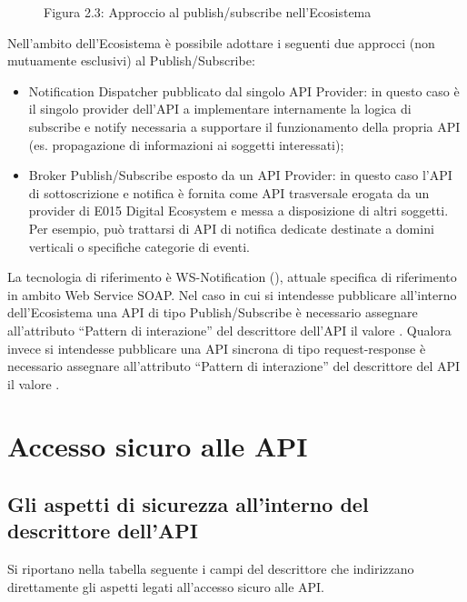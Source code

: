 \documentclass[letterpaper,10pt,italian]{sphinxmanual}
\begin{document}
\begin{figure}[htbp]
\centering
\capstart

\noindent{}
\caption{Figura 2.3: Approccio al publish/subscribe nell’Ecosistema}\label{\detokenize{sez21:id3}}\end{figure}

Nell’ambito dell’Ecosistema è possibile adottare i seguenti due approcci (non mutuamente esclusivi) al Publish/Subscribe:
\begin{itemize}
\item {} 
Notification Dispatcher pubblicato dal singolo API Provider: in questo caso è il singolo provider dell’API a implementare internamente la logica di subscribe e notify necessaria a supportare il funzionamento della propria API (es. propagazione di informazioni ai soggetti interessati);

\item {} 
Broker Publish/Subscribe esposto da un API Provider: in questo caso l’API di sottoscrizione e notifica è fornita come API trasversale erogata da un provider di E015 Digital Ecosystem e messa a disposizione di altri soggetti. Per esempio, può trattarsi di API di notifica dedicate destinate a domini verticali o specifiche categorie di eventi.

\end{itemize}

La tecnologia di riferimento è WS-Notification (), attuale specifica di riferimento in ambito Web Service SOAP.
Nel caso in cui si intendesse pubblicare all’interno dell’Ecosistema una API di tipo Publish/Subscribe è necessario assegnare all’attributo “Pattern di interazione” del descrittore dell’API il valore .
Qualora invece si intendesse pubblicare una API sincrona di tipo request-response è necessario assegnare all’attributo “Pattern di interazione” del descrittore del API il valore .


\section{Accesso sicuro alle API}
\label{\detokenize{sez22:sezione22}}\label{\detokenize{sez22:accesso-sicuro-alle-api}}\label{\detokenize{sez22::doc}}



\subsection{Gli aspetti di sicurezza all’interno del descrittore dell’API}
\label{\detokenize{sez22:sezione221}}\label{\detokenize{sez22:gli-aspetti-di-sicurezza-allinterno-del-descrittore-dellapi}}
Si riportano nella tabella seguente i campi del descrittore che indirizzano direttamente gli aspetti legati all’accesso sicuro alle API.
\end{document}
